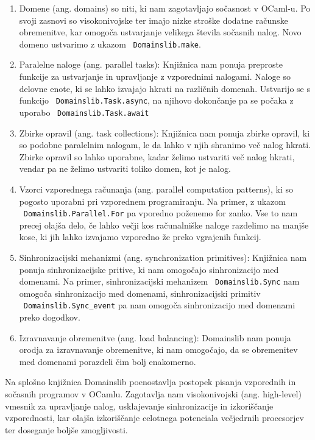 \documentclass[mat1, tisk]{fmfdelo}
\begin{document}
\begin{enumerate}
  \item Domene (ang. domains) so niti, ki nam zagotavljajo sočasnost v OCaml-u. 
        Po svoji zasnovi so visokonivojske ter imajo nizke stroške dodatne računske obremenitve, 
        kar omogoča ustvarjanje velikega števila sočasnih nalog. Novo domeno ustvarimo z ukazom ~\texttt{Domainslib.make}.
  \item Paralelne naloge (ang. parallel tasks): Knjižnica nam ponuja preproste funkcije za ustvarjanje in upravljanje z vzporednimi nalogami.
        Naloge so delovne enote, ki se lahko izvajajo hkrati na različnih domenah.
        Ustvarijo se s funkcijo ~\texttt{Domainslib.Task.async}, na njihovo dokončanje pa se počaka z uporabo ~\texttt{Domainslib.Task.await}
  \item Zbirke opravil (ang. task collections): Knjižnica nam ponuja zbirke opravil, ki so podobne paralelnim nalogam, 
        le da lahko v njih shranimo več nalog hkrati. Zbirke opravil so lahko uporabne, kadar želimo ustvariti več nalog hkrati, 
        vendar pa ne želimo ustvariti toliko domen, kot je nalog.
  \item Vzorci vzporednega računanja (ang. parallel computation patterns), ki so pogosto uporabni pri vzporednem programiranju.
        Na primer, z ukazom ~\texttt{Domainslib.Parallel.For} pa vporedno poženemo for zanko. Vse to nam precej olajša delo, če lahko večji kos računalniške naloge
        razdelimo na manjše kose, ki jih lahko izvajamo vzporedno že preko vgrajenih funkcij.
  \item Sinhronizacijski mehanizmi (ang. synchronization primitives): Knjižnica nam ponuja sinhronizacijske pritive, ki nam omogočajo sinhronizacijo med domenami.
        Na primer, sinhronizacijski mehanizem ~\texttt{Domainslib.Sync} nam omogoča sinhronizacijo med domenami, 
        sinhronizacijski primitiv ~\texttt{Domainslib.Sync\_event} pa nam omogoča sinhronizacijo med domenami preko dogodkov.
  \item Izravnavanje obremenitve (ang. load balancing): Domainslib nam ponuja orodja za izravnavanje obremenitve, 
        ki nam omogočajo, da se obremenitev med domenami porazdeli čim bolj enakomerno.
\end{enumerate}

Na splošno knjižnica Domainslib poenostavlja postopek pisanja vzporednih in sočasnih programov v OCamlu. 
Zagotavlja nam visokonivojski (ang. high-level) vmesnik za upravljanje nalog, usklajevanje sinhronizacije in izkoriščanje vzporednosti, 
kar olajša izkoriščanje celotnega potenciala večjedrnih procesorjev ter doseganje boljše zmogljivosti.
\end{document}
